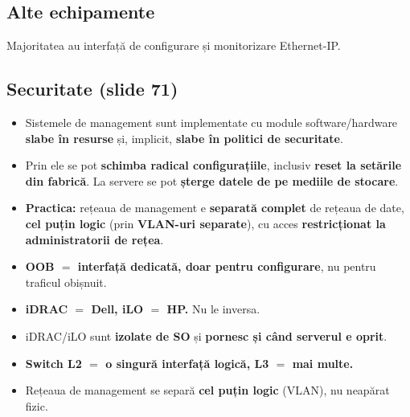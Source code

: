 \documentclass[11pt,a4paper]{article}
\begin{document}
\subsection*{Alte echipamente}
Majoritatea au interfață de configurare și monitorizare Ethernet-IP.

\subsection*{Securitate (slide 71)}
\begin{itemize}
  \item Sistemele de management sunt implementate cu module software/hardware \textbf{slabe în resurse} și, implicit, \textbf{slabe în politici de securitate}.
  \item Prin ele se pot \textbf{schimba radical configurațiile}, inclusiv \textbf{reset la setările din fabrică}. La servere se pot \textbf{șterge datele de pe mediile de stocare}.
  \item \textbf{Practica:} rețeaua de management e \textbf{separată complet} de rețeaua de date, \textbf{cel puțin logic} (prin \textbf{VLAN-uri separate}), cu acces \textbf{restricționat la administratorii de rețea}.
\end{itemize}

\begin{capcana}
\begin{itemize}
  \item \textbf{OOB $=$ interfață dedicată, doar pentru configurare}, nu pentru traficul obișnuit.
  \item \textbf{iDRAC $=$ Dell, iLO $=$ HP.} Nu le inversa.
  \item iDRAC/iLO sunt \textbf{izolate de SO} și \textbf{pornesc și când serverul e oprit}.
  \item \textbf{Switch L2 $=$ o singură interfață logică, L3 $=$ mai multe.}
  \item Rețeaua de management se separă \textbf{cel puțin logic} (VLAN), nu neapărat fizic.
\end{itemize}
\end{capcana}
\end{document}
